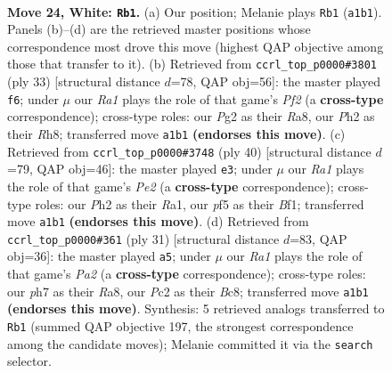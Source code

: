 \documentclass[11pt]{article}
\begin{document}
\clearpage

\begin{figure}[p]\centering
\begin{subfigure}{0.46\textwidth}\centering
\resizebox{\linewidth}{!}{%
\newchessgame
\chessboard[
  setfen={1n2qrk1/1r1b1ppp/8/4Pp2/p1p2P2/6K1/PPP3PP/R2Q1BNR w - - 2 24},
  showmover=false,
  pgfstyle=straightmove, color=movearrow, markmove={a1-b1}
]}
\caption{}
\end{subfigure}\hfill
\begin{subfigure}{0.46\textwidth}\centering
\resizebox{\linewidth}{!}{%
\newchessgame
\chessboard[
  setfen={r3k2r/2qpbppp/p3p3/4P2n/Pp1QN3/4BP2/1PP2P1P/R2R2K1 b kq - 1 17},
  showmover=false,
  pgfstyle=straightmove, color=movearrow, markmove={f7-f6}
]}
\caption{}
\end{subfigure}
\\[4pt]
\begin{subfigure}{0.46\textwidth}\centering
\resizebox{\linewidth}{!}{%
\newchessgame
\chessboard[
  setfen={r2q2rk/1ppb3p/p2p3p/3P1p2/P1PP3P/3Q4/3KPP2/R4B1R w - - 0 21},
  showmover=false,
  pgfstyle=straightmove, color=movearrow, markmove={e2-e3}
]}
\caption{}
\end{subfigure}\hfill
\begin{subfigure}{0.46\textwidth}\centering
\resizebox{\linewidth}{!}{%
\newchessgame
\chessboard[
  setfen={r1b2rk1/p2p2pp/1qnPp3/2p2p2/2P2B2/3B4/PP1Q1PPP/R3R1K1 b - - 6 16},
  showmover=false,
  pgfstyle=straightmove, color=movearrow, markmove={a7-a5}
]}
\caption{}
\end{subfigure}
\caption{\textbf{Move 24, White: \texttt{Rb1}.} (a) Our position; Melanie plays \texttt{Rb1} (\texttt{a1b1}). Panels (b)--(d) are the retrieved master positions whose correspondence most drove this move (highest QAP objective among those that transfer to it). (b) Retrieved from \texttt{ccrl\_top\_p0000\#3801} (ply 33) [structural distance $d$=78, QAP obj=56]: the master played \texttt{f6}; under $\mu$ our \emph{Ra1} plays the role of that game's \emph{Pf2} (a \textbf{cross-type} correspondence); cross-type roles: our \emph{P}g2 as their \emph{R}a8, our \emph{P}h2 as their \emph{R}h8; transferred move \texttt{a1b1} \textbf{(endorses this move)}. (c) Retrieved from \texttt{ccrl\_top\_p0000\#3748} (ply 40) [structural distance $d$=79, QAP obj=46]: the master played \texttt{e3}; under $\mu$ our \emph{Ra1} plays the role of that game's \emph{Pe2} (a \textbf{cross-type} correspondence); cross-type roles: our \emph{P}h2 as their \emph{R}a1, our \emph{p}f5 as their \emph{B}f1; transferred move \texttt{a1b1} \textbf{(endorses this move)}. (d) Retrieved from \texttt{ccrl\_top\_p0000\#361} (ply 31) [structural distance $d$=83, QAP obj=36]: the master played \texttt{a5}; under $\mu$ our \emph{Ra1} plays the role of that game's \emph{Pa2} (a \textbf{cross-type} correspondence); cross-type roles: our \emph{p}h7 as their \emph{R}a8, our \emph{P}c2 as their \emph{B}c8; transferred move \texttt{a1b1} \textbf{(endorses this move)}. Synthesis: 5 retrieved analogs transferred to \texttt{Rb1} (summed QAP objective 197, the strongest correspondence among the candidate moves); Melanie committed it via the \texttt{search} selector.}
\label{fig:thought-m46}
\end{figure}
\end{document}

